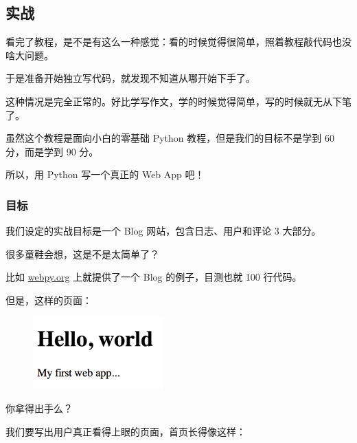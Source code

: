 \hypertarget{ux5b9eux6218}{%
\subsection{实战}\label{ux5b9eux6218}}

看完了教程，是不是有这么一种感觉：看的时候觉得很简单，照着教程敲代码也没啥大问题。

于是准备开始独立写代码，就发现不知道从哪开始下手了。

这种情况是完全正常的。好比学写作文，学的时候觉得简单，写的时候就无从下笔了。

虽然这个教程是面向小白的零基础 Python 教程，但是我们的目标不是学到 60
分，而是学到 90 分。

所以，用 Python 写一个真正的 Web App 吧！

\hypertarget{ux76eeux6807}{%
\subsubsection{目标}\label{ux76eeux6807}}

我们设定的实战目标是一个 Blog 网站，包含日志、用户和评论 3 大部分。

很多童鞋会想，这是不是太简单了？

比如 \href{http://webpy.org/src/blog/0.3}{webpy.org} 上就提供了一个 Blog
的例子，目测也就 100 行代码。

但是，这样的页面：

 
 \begin{figure}[htp]
	\centering
	\includegraphics[width=0.6\linewidth]{fig/954926361167104.png}
\end{figure}


你拿得出手么？

我们要写出用户真正看得上眼的页面，首页长得像这样：

